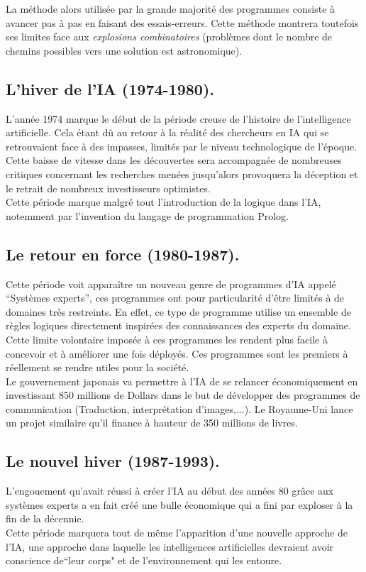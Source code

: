 \documentclass[a4paper, 12pt]{article}
\numberwithin{equation}{subsection}
\begin{document}
La méthode alors utilisée par la grande majorité des programmes consiste à avancer pas à pas en faisant des essais-erreurs. Cette méthode montrera toutefois ses limites face aux \textit{explosions combinatoires} (problèmes dont le nombre de chemins possibles vers une solution est astronomique).
\subsection{L'hiver de l'IA (1974-1980).}
L'année 1974 marque le début de la période creuse de l'histoire de l'intelligence artificielle. Cela étant dû au retour à la réalité des chercheurs en IA qui se retrouvaient face à des impasses, limités par le niveau technologique de l'époque. Cette baisse de vitesse dans les découvertes sera accompagnée de nombreuses critiques concernant les recherches menées jusqu'alors provoquera la déception et le retrait de nombreux investisseurs optimistes.\\

Cette période marque malgré tout l'introduction de la logique dans l'IA, notemment par l'invention du langage de programmation Prolog.
\subsection{Le retour en force (1980-1987).}
Cette période voit apparaître un nouveau genre de programmes d'IA appelé ``Systèmes experts'', ces programmes ont pour particularité d'être limités à de domaines très restreints. En effet, ce type de programme utilise un ensemble de règles logiques directement inspirées des connaissances des experts du domaine. Cette limite volontaire imposée à ces programmes les rendent plus facile à concevoir et à améliorer une fois déployés. Ces programmes sont les premiers à réellement se rendre utiles pour la société.\\

Le gouvernement japonais va permettre à l'IA de se relancer économiquement en investissant 850 millions de Dollars dans le but de développer des programmes de communication (Traduction, interprétation d'images,...). Le Royaume-Uni lance un projet similaire qu'il finance à hauteur de 350 millions de livres.
\subsection{Le nouvel hiver (1987-1993).}
L'engouement qu'avait réussi à créer l'IA au début des années 80 grâce aux systèmes experts a en fait créé une bulle économique qui a fini par exploser à la fin de la décennie.\\
Cette période marquera tout de même l'apparition d'une nouvelle approche de l'IA, une approche dans laquelle les intelligences artificielles devraient avoir conscience de``leur corps" et de l'environnement qui les entoure.
\end{document}
